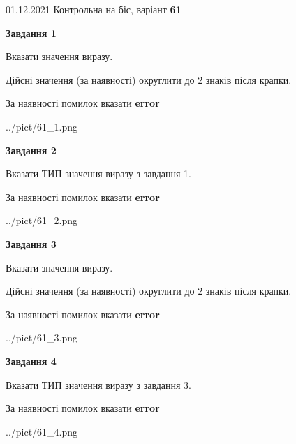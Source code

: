 \documentclass[11pt, ukrainian]{article}
\begin{document}
{01.12.2021 Контрольна на біс, варіант  \No \textbf { 61 }\par}
{
\begin {large}
{\begin {center}\textbf{Завдання 1}\end {center}}\par
Вказати значення виразу. \par
Дійсні значення (за наявності) округлити до 2 знаків після крапки. \par
За наявності помилок вказати \textbf{error}

\begin{center}
	{../pict/61_1.png}
\end{center}
\newpage

{\begin {center}\textbf{Завдання 2}\end {center}}\par
Вказати ТИП значення виразу з завдання 1. \par
За наявності помилок вказати \textbf{error}

\begin{center}
	{../pict/61_2.png}
\end{center}
\newpage

{\begin {center}\textbf{Завдання 3}\end {center}}\par
Вказати значення виразу. \par
Дійсні значення (за наявності) округлити до 2 знаків після крапки. \par
За наявності помилок вказати \textbf{error}

\begin{center}
	{../pict/61_3.png}
\end{center}
\newpage

{\begin {center}\textbf{Завдання 4}\end {center}}\par
Вказати ТИП значення виразу з завдання 3. \par
За наявності помилок вказати \textbf{error}

\begin{center}
	{../pict/61_4.png}
\end{center}
\newpage


\end{large}}
\end{document}
